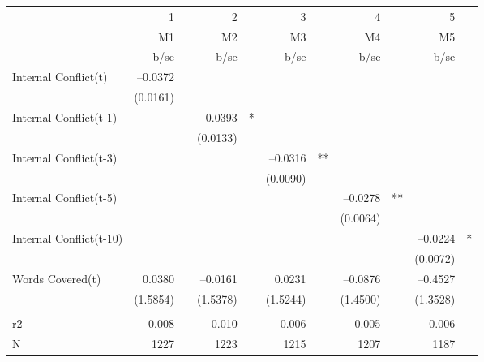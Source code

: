 \begin{tabular} {l* {5}{r @{} l}}
\hline
            &           1&   &           2&   &           3&   &           4&   &           5&   \\
            &          M1&   &          M2&   &          M3&   &          M4&   &          M5&   \\
            &        b/se&   &        b/se&   &        b/se&   &        b/se&   &        b/se&   \\
\hline
Internal Conflict(t)&    --0.0372&   &            &   &            &   &            &   &            &   \\
            &    (0.0161)&   &            &   &            &   &            &   &            &   \\
Internal Conflict(t-1)&            &   &    --0.0393&*  &            &   &            &   &            &   \\
            &            &   &    (0.0133)&   &            &   &            &   &            &   \\
Internal Conflict(t-3)&            &   &            &   &    --0.0316&** &            &   &            &   \\
            &            &   &            &   &    (0.0090)&   &            &   &            &   \\
Internal Conflict(t-5)&            &   &            &   &            &   &    --0.0278&** &            &   \\
            &            &   &            &   &            &   &    (0.0064)&   &            &   \\
Internal Conflict(t-10)&            &   &            &   &            &   &            &   &    --0.0224&*  \\
            &            &   &            &   &            &   &            &   &    (0.0072)&   \\
Words Covered(t)&      0.0380&   &    --0.0161&   &      0.0231&   &    --0.0876&   &    --0.4527&   \\
            &    (1.5854)&   &    (1.5378)&   &    (1.5244)&   &    (1.4500)&   &    (1.3528)&   \\
 \\
r2          &       0.008&   &       0.010&   &       0.006&   &       0.005&   &       0.006&   \\
N           &        1227&   &        1223&   &        1215&   &        1207&   &        1187&   \\
\hline
\end{tabular}
